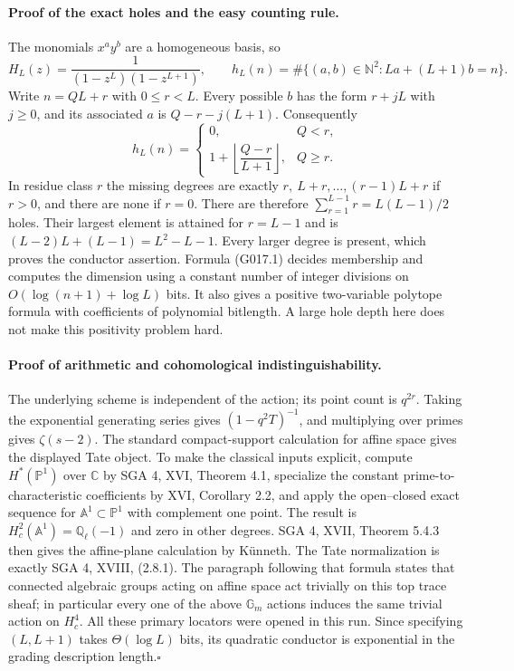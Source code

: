 \paragraph{Proof of the exact holes and the easy counting rule.}
The monomials $x^ay^b$ are a homogeneous basis, so
\[
H_L(z)=\frac1{(1-z^L)(1-z^{L+1})},\qquad
h_L(n)=\#\{(a,b)\in\mathbb N^2:La+(L+1)b=n\}.
\]
Write $n=QL+r$ with $0\le r<L$. Every possible $b$ has the
form $r+jL$ with $j\ge0$, and its associated $a$ is
$Q-r-j(L+1)$. Consequently
\[
h_L(n)=
\begin{cases}
0,&Q<r,\\
1+\left\lfloor\dfrac{Q-r}{L+1}\right\rfloor,&Q\ge r.
\end{cases}                                                \tag{G017.1}
\]
In residue class $r$ the missing degrees are exactly
$r,\ L+r,\ldots,(r-1)L+r$ if $r>0$, and there are none
if $r=0$. There are therefore $\sum_{r=1}^{L-1}r=L(L-1)/2$
holes. Their largest element is attained for $r=L-1$ and
is $(L-2)L+(L-1)=L^2-L-1$. Every larger degree is present,
which proves the conductor assertion. Formula (G017.1)
decides membership and computes the dimension using a constant
number of integer divisions on $O(\log(n+1)+\log L)$ bits.
It also gives a positive two-variable polytope formula with
coefficients of polynomial bitlength. A large hole depth here
does not make this positivity problem hard.

\paragraph{Proof of arithmetic and cohomological indistinguishability.}
The underlying scheme is independent of the action; its point
count is $q^{2r}$. Taking the exponential generating series
gives $(1-q^2T)^{-1}$, and multiplying over primes gives
$\zeta(s-2)$. The standard compact-support calculation for
affine space gives the displayed Tate object. To make the
classical inputs explicit, compute $H^*(\mathbb P^1)$ over
$\mathbb C$ by SGA 4, XVI, Theorem 4.1, specialize the constant
prime-to-characteristic coefficients by XVI, Corollary 2.2,
and apply the open--closed exact sequence for
$\mathbb A^1\subset\mathbb P^1$ with complement one point.
The result is $H_c^2(\mathbb A^1)=\mathbb Q_\ell(-1)$ and
zero in other degrees. SGA 4, XVII, Theorem 5.4.3 then gives
the affine-plane calculation by K\"unneth. The Tate
normalization is exactly SGA 4, XVIII, (2.8.1). The paragraph
following that formula states that connected algebraic groups
acting on affine space act trivially on this top trace sheaf;
in particular every one of the above $\mathbb G_m$ actions
induces the same trivial action on $H_c^4$. All these primary
locators were opened in this run. Since specifying $(L,L+1)$ takes $\Theta(\log L)$ bits, its quadratic conductor is
exponential in the grading description length.\hfill$\square$

